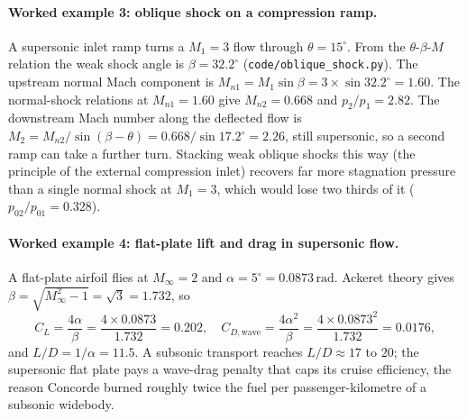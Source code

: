 \paragraph{Worked example 3: oblique shock on a compression ramp.}
A supersonic inlet ramp turns a $M_1 = 3$ flow through
$\theta = 15^{\circ}$. From the $\theta$-$\beta$-$M$ relation the weak
shock angle is $\beta = 32.2^{\circ}$
(\texttt{code/oblique\_shock.py}). The upstream normal Mach component
is $M_{n1} = M_1 \sin\beta = 3\times \sin 32.2^{\circ} = 1.60$. The
normal-shock relations at $M_{n1} = 1.60$ give $M_{n2} = 0.668$ and
$p_2/p_1 = 2.82$. The downstream Mach number along the deflected flow
is $M_2 = M_{n2}/\sin(\beta - \theta) = 0.668/\sin 17.2^{\circ} =
2.26$, still supersonic, so a second ramp can take a further turn.
Stacking weak oblique shocks this way (the principle of the external
compression inlet) recovers far more stagnation pressure than a single
normal shock at $M_1 = 3$, which would lose two thirds of it
($p_{02}/p_{01} = 0.328$).

\paragraph{Worked example 4: flat-plate lift and drag in supersonic
flow.} A flat-plate airfoil flies at $M_\infty = 2$ and
$\alpha = 5^{\circ} = 0.0873\,\text{rad}$. Ackeret theory gives
$\beta = \sqrt{M_\infty^2 - 1} = \sqrt{3} = 1.732$, so
\[
C_L = \frac{4\alpha}{\beta} = \frac{4\times 0.0873}{1.732} = 0.202,
\quad
C_{D,\text{wave}} = \frac{4\alpha^2}{\beta} = \frac{4\times 0.0873^2}{
1.732} = 0.0176,
\]
and $L/D = 1/\alpha = 11.5$. A subsonic transport reaches $L/D \approx
17$ to $20$; the supersonic flat plate pays a wave-drag penalty that
caps its cruise efficiency, the reason Concorde burned roughly twice
the fuel per passenger-kilometre of a subsonic widebody.





